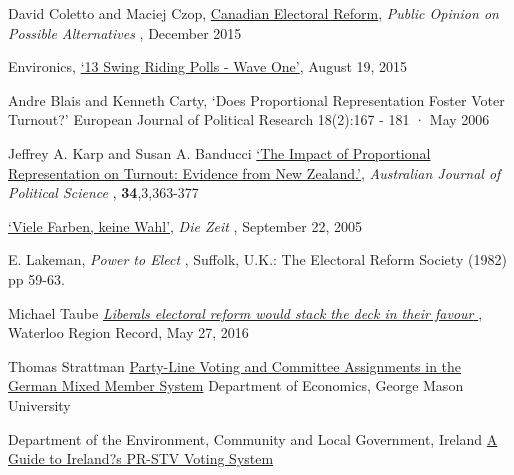 \documentclass[DIV=calc, paper=a4, fontsize=11pt, twocolumn]{scrartcl}	 %
\begin{document}

\begin{thebibliography}{99} %

David Coletto and Maciej Czop,
{\color{blue} \href{https://d3n8a8pro7vhmx.cloudfront.net/broadbent/pages/4770/attachments/original/1448994262/Canadian_Electoral_Reform_-_Report.pdf?1448994262}{Canadian Electoral Reform}},
{\emph{Public Opinion on Possible Alternatives} }, December 2015

Environics,
{\color{blue} \href{http://www.votetogether.ca/pages/localpolling/}{`13 Swing Riding Polls - Wave One'}}, August 19, 2015

Andre Blais and Kenneth Carty, 
`Does Proportional Representation Foster Voter Turnout?'
European Journal of Political Research 18(2):167 - 181 · May 2006

Jeffrey A. Karp and Susan A. Banducci
{\color{blue} \href{http://www.jkarp.com/pdf/ajps_1999.pdf}{`The Impact of Proportional Representation on Turnout: Evidence from New Zealand.'}},
{ \emph{Australian Journal of Political Science} }, \textbf{34},3,363-377

  
{\color{blue} \href{http://www.zeit.de/2005/39/Wahl\_paradox}{`Viele Farben, keine Wahl'}},
 { \emph{Die Zeit} }, September 22, 2005

E. Lakeman,
{ \emph{Power to Elect} }, Suffolk, U.K.: The Electoral Reform Society (1982) pp 59-63.

 Michael Taube
{\color{blue} \href{http://www.therecord.com/opinion-story/6692466-liberals-electoral-reform-would-stack-the-deck-in-their-favour/}{ \emph{Liberals electoral reform would stack the deck in their favour} } },
Waterloo Region Record, May 27, 2016 

Thomas Strattman
{\color{blue} \href{http://www.gmu.edu/centers/publicchoice/faculty%20pages/stratmann/vitae%20files/bunddev.pdf}{Party-Line Voting and Committee Assignments in the German Mixed Member System}}
Department of Economics, George Mason University

Department of the Environment, Community and Local Government, Ireland
{\color{blue} \href{http://www.environ.ie/sites/default/files/publications/files/guide_to_ireland_pr-stv_system_0.pdf}{A Guide to Ireland?s PR-STV Voting System}}
 
\end{thebibliography}
\end{document}
